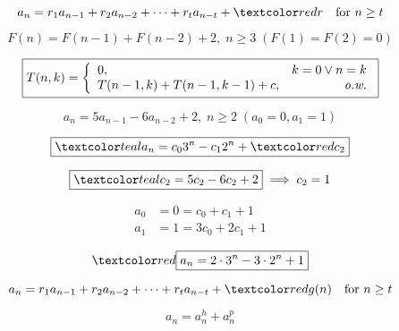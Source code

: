 \begin{frame}{}
  \centerline{}

  \[
    a_n = r_1 a_{n-1} + r_2 a_{n-2} + \cdots + r_t a_{n-t} + \red{r} \quad \text{for } n \ge t
  \]

  \pause
  \[
    F(n) = F(n-1) + F(n-2) + 2, \; n \ge 3\; (F(1) = F(2) = 0)
  \]

  \pause
  \vspace{-0.30cm}
  \[
    \boxed{T(n,k) = \left\{\begin{array}{lr}
      0, & k = 0 \lor n = k \\
      T(n-1, k) + T(n-1, k-1) + c, & \text{\it o.w.}
    \end{array}\right.}
  \]
\end{frame}

\begin{frame}{}
  \[
    a_n = 5a_{n-1} - 6a_{n-2} + 2, \; n \ge 2 \; (a_0 = 0, a_1 = 1)
  \]

  \pause
  \[
    \boxed{\teal{a_n = c_0 3^n - c_1 2^n + \red{c_2}}}
  \]

  \pause
  \[
    \boxed{\teal{c_2 = 5c_2 - 6c_2 + 2}} \implies c_2 = 1
  \]

  \pause
  \begin{align*}
    a_0 &= 0 = c_0 + c_1 + 1\\
    a_1 &= 1 = 3c_0 + 2c_1 + 1
  \end{align*}

  \pause
  \[
    \red{\boxed{a_n = 2 \cdot 3^n - 3 \cdot 2^n + 1}}
  \]
\end{frame}

\begin{frame}{}
  \centerline{}
\end{frame}

\begin{frame}{}
  \[
    a_n = r_1 a_{n-1} + r_2 a_{n-2} + \cdots + r_t a_{n-t} + \red{g(n)} \quad \text{for } n \ge t
  \]

  \pause
  \vspace{0.50cm}
  \[
    a_n = a_n^{h} + a_n^{p}
  \]
  \centerline{\href{http://mysite.science.uottawa.ca/msajna/MAT2348/non-hom-RR.pdf}
  {}}
\end{frame}

